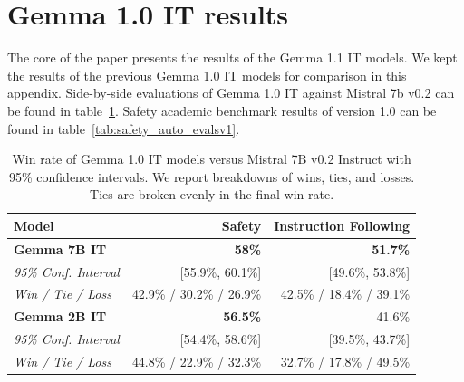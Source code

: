 \documentclass[11pt, a4paper, logo, twocolumn, copyright, nonumbering]{googledeepmind}
\begin{document}


\clearpage
\appendix
\onecolumn

\section{Gemma 1.0 IT results}
The core of the paper presents the results of the Gemma 1.1 IT models. We kept the results of the previous Gemma 1.0 IT models for comparison in this appendix. Side-by-side evaluations of Gemma 1.0 IT against Mistral 7b v0.2 can be found in table~\ref{tab:itv1}. Safety academic benchmark results of version 1.0 can be found in table~\ref{tab:safety_auto_evalsv1}.

\vspace{1cm}

\begin{table}[h]
    \setlength{\tabcolsep}{6pt}
    \centering
    \footnotesize
    \begin{tabular}{l r r}
    \toprule
    Model & Safety & Instruction Following \\
    \midrule
   \textbf{Gemma 7B IT} & \textbf{58\%} &  \textbf{51.7\%} \\
\tiny{\textit{95\% Conf. Interval}} & \tiny{[55.9\%, 60.1\%]} & \tiny{[49.6\%, 53.8\%]} \vspace{-0.05cm} \\
\tiny{\textit{Win / Tie / Loss}} & \tiny{42.9\% / 30.2\% / 26.9\%} & \tiny{42.5\% / 18.4\% / 39.1\%} \vspace{0.2cm} \\
   \textbf{Gemma 2B IT} & \textbf{56.5\%} &  41.6\% \\
\tiny{\textit{95\% Conf. Interval}} & \tiny{[54.4\%, 58.6\%]} & \tiny{[39.5\%, 43.7\%]}  \vspace{-0.05cm} \\
\tiny{\textit{Win / Tie / Loss}} & \tiny{44.8\% / 22.9\% / 32.3\%} & \tiny{32.7\% / 17.8\% / 49.5\%} \\
    \bottomrule
    \end{tabular}
    \caption{Win rate of Gemma 1.0 IT models versus Mistral 7B v0.2 Instruct with 95\% confidence intervals. We report breakdowns of wins, ties, and losses. Ties are broken evenly in the final win rate.}
    \label{tab:itv1}
\end{table}

\vspace{1cm}
\end{document}

